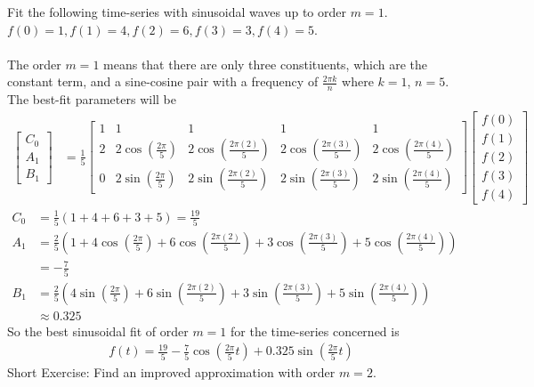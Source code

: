 \begin{exmp}
\label{ex11.2.1}
Fit the following time-series with sinusoidal waves up to order $m=1$. $f(0) = 1, f(1) = 4, f(2) = 6, f(3) = 3, f(4) = 5$.\\
\\
The order $m=1$ means that there are only three constituents, which are the constant term, and a sine-cosine pair with a frequency of $\frac{2\pi k}{n}$ where $k=1$, $n=5$. The best-fit parameters will be
\begin{align*}
\begin{bmatrix}
C_0 \\
A_1 \\
B_1
\end{bmatrix}
&= 
\frac{1}{5}
\begin{bmatrix}
1 & 1 & 1 & 1 & 1 \\
2 & 2\cos(\frac{2\pi}{5}) & 2\cos(\frac{2\pi(2)}{5}) & 2\cos(\frac{2\pi(3)}{5}) & 2\cos(\frac{2\pi(4)}{5}) \\
0 & 2\sin(\frac{2\pi}{5}) & 2\sin(\frac{2\pi(2)}{5}) & 2\sin(\frac{2\pi(3)}{5}) & 2\sin(\frac{2\pi(4)}{5})
\end{bmatrix}
\begin{bmatrix}
f(0)\\
f(1)\\
f(2)\\
f(3)\\
f(4)
\end{bmatrix} 
\end{align*}
\begin{align*}
C_0 &= \frac{1}{5} (1+4+6+3+5) = \frac{19}{5} \\
A_1 &= \frac{2}{5} (1 + 4\cos(\frac{2\pi}{5}) + 6\cos(\frac{2\pi(2)}{5}) + 3\cos(\frac{2\pi(3)}{5}) + 5\cos(\frac{2\pi(4)}{5})) \\
&= -\frac{7}{5} \\
B_1 &= \frac{2}{5} (4\sin(\frac{2\pi}{5}) + 6\sin(\frac{2\pi(2)}{5}) + 3\sin(\frac{2\pi(3)}{5}) + 5\sin(\frac{2\pi(4)}{5})) \\
&\approx 0.325
\end{align*}
So the best sinusoidal fit of order $m=1$ for the time-series concerned is
\begin{align*}
f(t) = \frac{19}{5} - \frac{7}{5} \cos(\frac{2\pi}{5}t) + 0.325 \sin(\frac{2\pi}{5}t)
\end{align*}
Short Exercise: Find an improved approximation with order $m = 2$.
\end{exmp}

